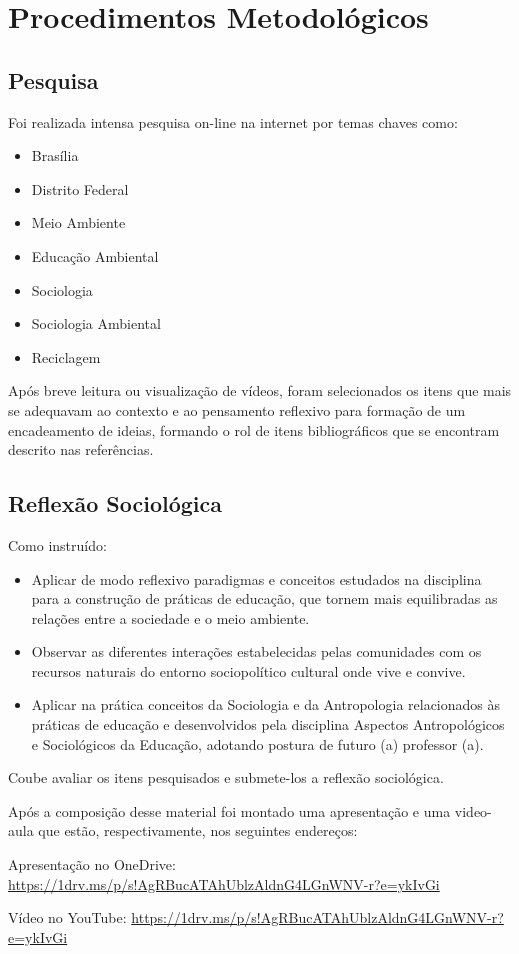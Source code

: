 \chapter{Procedimentos Metodológicos}

\section{Pesquisa}

Foi realizada intensa pesquisa on-line na internet por temas chaves como:
\begin{itemize}
    \item Brasília
    \item Distrito Federal
    \item Meio Ambiente
    \item Educação Ambiental
    \item Sociologia
    \item Sociologia Ambiental
    \item Reciclagem
\end{itemize}

Após breve leitura ou visualização de vídeos, foram selecionados os itens que mais se adequavam ao contexto e ao pensamento reflexivo para formação de um encadeamento de ideias, formando o rol de itens bibliográficos que se encontram descrito nas referências.

\section{Reflexão Sociológica}

Como instruído:
\begin{itemize}
    \item Aplicar de modo reflexivo paradigmas e conceitos estudados na disciplina para a construção de práticas de educação, que tornem mais equilibradas as relações entre a sociedade e o meio ambiente.
    \item Observar as diferentes interações estabelecidas pelas comunidades com os recursos naturais do entorno sociopolítico cultural onde vive e convive.
    \item Aplicar na prática conceitos da Sociologia e da Antropologia relacionados às práticas de educação e desenvolvidos pela disciplina Aspectos Antropológicos e Sociológicos da Educação, adotando postura de futuro (a) professor (a).
\end{itemize}

Coube avaliar os itens pesquisados e submete-los a reflexão sociológica.

Após a composição desse material foi montado uma apresentação e uma video-aula que estão, respectivamente, nos seguintes endereços:

Apresentação no OneDrive: \url{https://1drv.ms/p/s!AgRBucATAhUblzAldnG4LGnWNV-r?e=ykIvGi} \\

Vídeo no YouTube: \url{https://1drv.ms/p/s!AgRBucATAhUblzAldnG4LGnWNV-r?e=ykIvGi} \\

